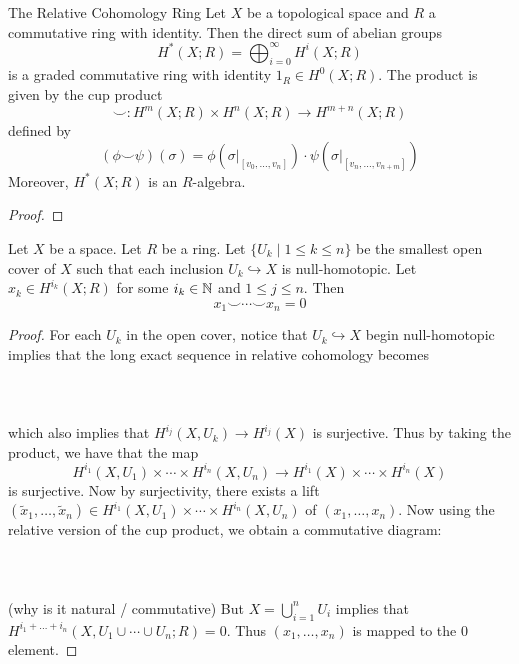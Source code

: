 \documentclass[a4paper]{article}
\begin{document}
\begin{thm}{The Relative Cohomology Ring}{} Let $X$ be a topological space and $R$ a commutative ring with identity. Then the direct sum of abelian groups $$H^\ast(X;R)=\bigoplus_{i=0}^\infty H^i(X;R)$$ is a graded commutative ring with identity $1_R\in H^0(X;R)$. The product is given by the cup product $$\smile:H^m(X;R)\times H^n(X;R)\to H^{m+n}(X;R)$$ defined by $$(\phi\smile\psi)(\sigma)=\phi(\sigma|_{[v_0,\dots,v_n]})\cdot\psi(\sigma|_{[v_n,\dots,v_{n+m}]})$$ Moreover, $H^\ast(X;R)$ is an $R$-algebra. \tcbline
\begin{proof}
\end{proof}
\end{thm}

\begin{prp}{}{} Let $X$ be a space. Let $R$ be a ring. Let $\{U_k\;|\;1\leq k\leq n\}$ be the smallest open cover of $X$ such that each inclusion $U_k\hookrightarrow X$ is null-homotopic. Let $x_k\in H^{i_k}(X;R)$ for some $i_k\in\mathbb{N}$ and $1\leq j\leq n$. Then $$x_1\smile\cdots\smile x_n=0$$ \tcbline
\begin{proof}
For each $U_k$ in the open cover, notice that $U_k\hookrightarrow X$ begin null-homotopic implies that the long exact sequence in relative cohomology becomes \\~\\
\\~\\
which also implies that $H^{i_j}(X,U_k)\to H^{i_j}(X)$ is surjective. Thus by taking the product, we have that the map $$H^{i_1}(X,U_1)\times\cdots\times H^{i_n}(X,U_n)\to H^{i_1}(X)\times\cdots\times H^{i_n}(X)$$ is surjective. Now by surjectivity, there exists a lift $(\tilde{x}_1,\dots,\tilde{x}_n)\in H^{i_1}(X,U_1)\times\cdots\times H^{i_n}(X,U_n)$ of $(x_1,\dots,x_n)$. Now using the relative version of the cup product, we obtain a commutative diagram: \\~\\
\\~\\
(why is it natural / commutative) But $X=\bigcup_{i=1}^nU_i$ implies that $H^{i_1+\dots+i_n}(X,U_1\cup\cdots\cup U_n;R)=0$. Thus $(x_1,\dots,x_n)$ is mapped to the $0$ element. 
\end{proof}
\end{prp}
\end{document}
